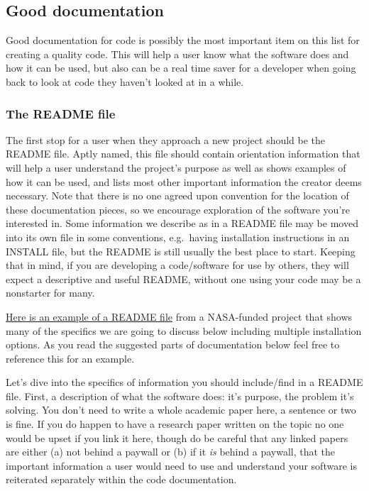 \documentclass[
  letterpaper,
  DIV=11,
  numbers=noendperiod]{scrreport}
\begin{document}
\hypertarget{good-documentation}{%
\subsection{Good documentation}\label{good-documentation}}

Good documentation for code is possibly the most important item on this
list for creating a quality code. This will help a user know what the
software does and how it can be used, but also can be a real time saver
for a developer when going back to look at code they haven't looked at
in a while.

\hypertarget{the-readme-file}{%
\subsubsection{The README file}\label{the-readme-file}}

The first stop for a user when they approach a new project should be the
README file. Aptly named, this file should contain orientation
information that will help a user understand the project's purpose as
well as shows examples of how it can be used, and lists most other
important information the creator deems necessary. Note that there is no
one agreed upon convention for the location of these documentation
pieces, so we encourage exploration of the software you're interested
in. Some information we describe as in a README file may be moved into
its own file in some conventions, e.g.~having installation instructions
in an INSTALL file, but the README is still usually the best place to
start. Keeping that in mind, if you are developing a code/software for
use by others, they will expect a descriptive and useful README, without
one using your code may be a nonstarter for many.

\href{https://github.com/MillionConcepts/lhorizon}{Here is an example of
a README file} from a NASA-funded project that shows many of the
specifics we are going to discuss below including multiple installation
options. As you read the suggested parts of documentation below feel
free to reference this for an example.

Let's dive into the specifics of information you should include/find in
a README file. First, a description of what the software does: it's
purpose, the problem it's solving. You don't need to write a whole
academic paper here, a sentence or two is fine. If you do happen to have
a research paper written on the topic no one would be upset if you link
it here, though do be careful that any linked papers are either (a) not
behind a paywall or (b) if it \emph{is} behind a paywall, that the
important information a user would need to use and understand your
software is reiterated separately within the code documentation.
\end{document}
